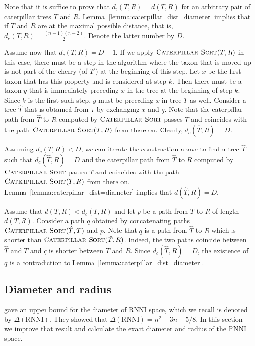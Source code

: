 \documentclass{amsart}
\newcommand{\rnni}{\mathrm{RNNI}}
\newcommand{\csort}{\textsc{Caterpillar Sort}}
\begin{document}
\proof
Note that it is suffice to prove that $d_c(T, R) = d(T, R)$ for an arbitrary pair of caterpillar trees $T$ and $R$.
Lemma~\ref{lemma:caterpillar_dist=diameter} implies that if $T$ and $R$ are at the maximal possible distance, that is, $d_c(T, R) = \frac{(n-1)(n-2)}{2}$.
Denote the latter number by $D$.

Assume now that $d_c(T, R) = D - 1$.
If we apply $\csort(T, R)$ in this case, there must be a step in the algorithm where the taxon that is moved up is not part of the cherry (of $T'$) at the beginning of this step.
Let $x$ be the first taxon that has this property and is considered at step $k$.
Then there must be a taxon $y$ that is immediately preceding $x$ in the tree at the beginning of step $k$.
Since $k$ is the first such step, $y$ must be preceding $x$ in tree $T$ as well.
Consider a tree $\hat T$ that is obtained from $T$ by exchanging $x$ and $y$.
Note that the caterpillar path from $\hat T$ to $R$ computed by $\csort$ passes $T$ and coincides with the path $\csort(T, R)$ from there on.
Clearly, $d_c(\hat T, R) = D$.

Assuming $d_c(T, R) < D$, we can iterate the construction above to find a tree $\hat T$ such that $d_c(\hat T, R) = D$ and the caterpillar path from $\hat T$ to $R$ computed by $\csort$ passes $T$ and coincides with the path $\csort(T, R)$ from there on.
Lemma~\ref{lemma:caterpillar_dist=diameter} implies that $d(\hat T, R) = D$.

Assume that $d(T, R) < d_c(T, R)$ and let $p$ be a path from $T$ to $R$ of length $d(T, R)$.
Consider a path $q$ obtained by concatenating paths $\csort(\hat T, T)$ and $p$.
Note that $q$ is a path from $\hat T$ to $R$ which is shorter than $\csort(\hat T, R)$.
Indeed, the two paths coincide between $\hat T$ and $T$ and $q$ is shorter between $T$ and $R$.
Since $d_c(\hat T, R) = D$, the existence of $q$ is a contradiction to Lemma~\ref{lemma:caterpillar_dist=diameter}.
\endproof


\subsection{Diameter and radius}
\label{section:diameter}

\textcite[Theorem~7]{Gavryushkin2018-ol} gave an upper bound for the diameter of $\rnni$ space, which we recall is denoted by $\Delta(\rnni)$.
They showed that $\Delta(\rnni) = n^2 - 3n - 5/8$.
In this section we improve that result and calculate the exact diameter and radius of the $\rnni$ space.
\end{document}
